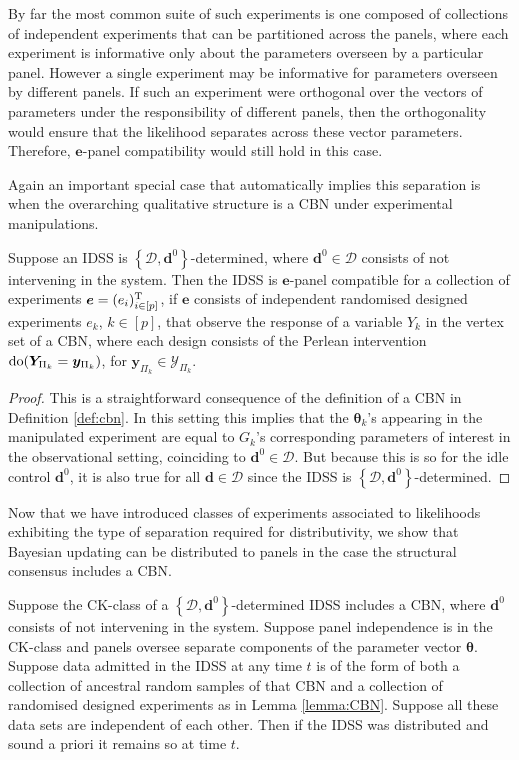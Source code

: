 By far the most common suite of such experiments is one composed of collections of independent experiments that can be partitioned across the panels, where each experiment is informative only about the parameters overseen by a particular panel. However a single experiment may be informative for parameters overseen by different panels. If such an experiment were orthogonal over the vectors of parameters under the responsibility of different panels, then the orthogonality would ensure that the likelihood separates across these vector parameters. Therefore, $\bm{e}$-panel compatibility would still hold in this case. 

Again an important special case that automatically implies this separation is when the overarching qualitative structure is a CBN under experimental manipulations. 

\begin{lemma}
\label{lemma:CBN}
Suppose an IDSS is $\left\{ \bm{\mathcal{D}},\bm{d}^{0}\right\}$-determined, where $\bm{d}^{0}\in \bm{\mathcal{D}}$ consists of not intervening in the system. Then the IDSS is $\bm{e}$-panel compatible for a collection of experiments $\bm{e}=(e_i)_{i\in[p]}^{\textnormal{T}}$, if $\bm{e}$ consists of independent randomised designed experiments $e_{k}$, $k\in[p]$,  that observe the response of a variable $Y_{k}$ in the vertex set of a CBN, where each design consists of the Perlean intervention $\textnormal{do}(\bm{Y}_{\Pi_k}=\bm{y}_{\Pi_k})$, for $\bm{y}_{\Pi_k}\in\bm{\mathcal{Y}}_{\Pi_k}$.
\end{lemma}

\begin{proof}
This is a straightforward consequence of the definition of a CBN in Definition \ref{def:cbn}. In this setting this implies that the $\bm{\theta }_{k}$'s appearing in the manipulated experiment are equal to $G_{k}$'s corresponding parameters of interest in the observational setting, coinciding to $\bm{d}^{0}\in\bm{ \mathcal{D}}$. But because this is so for the idle control $\bm{d}^{0}$, it is also true for all $\bm{d}\in \bm{\mathcal{D}}$ since the IDSS is $\left\{ \bm{\mathcal{D}},\bm{d}^{0}\right\}$-determined.
\end{proof}

Now that we have introduced classes of experiments associated to likelihoods exhibiting the type of separation required for distributivity, we show that Bayesian updating can be distributed to panels in the case the structural consensus includes a CBN.

\begin{theorem}
\label{theo:CBN}
Suppose the CK-class of a $\left\{\bm{\mathcal{D}},\bm{d}^0\right\}$-determined IDSS includes a CBN, where $\bm{d}^0$ consists of not intervening in the system. Suppose panel independence is in the CK-class and panels oversee separate components of the parameter vector $\bm{\theta}$. Suppose data admitted in the IDSS at any time $t$ is of the form of both a collection of ancestral random samples of that CBN and a collection of randomised designed experiments as in Lemma \ref{lemma:CBN}. Suppose all these data sets are independent of each other. Then if the IDSS was distributed and sound a priori it remains so at time $t$. 
\end{theorem}

